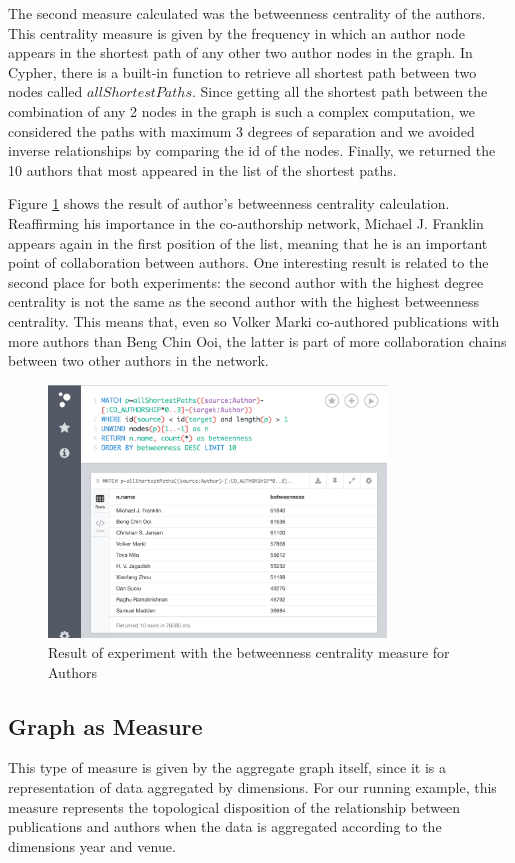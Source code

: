 The second measure calculated was the betweenness centrality of the authors. This centrality measure is given by the frequency in which an author node appears in the shortest path of any other two author nodes in the graph. In Cypher, there is a built-in function to retrieve all shortest path between two nodes called $allShortestPaths$. Since getting all the shortest path between the combination of any 2 nodes in the graph is such a complex computation, we considered the paths with maximum 3 degrees of separation and we avoided inverse relationships by comparing the id of the nodes. Finally, we returned the 10 authors that most appeared in the list of the shortest paths.

Figure \ref{fig:figure36} shows the result of author's betweenness centrality calculation. Reaffirming his importance in the co-authorship network, Michael J. Franklin appears again in the first position of the list, meaning that he is an important point of collaboration between authors. One interesting result is related to the second place for both experiments: the second author with the highest degree centrality is not the same as the second author with the highest betweenness centrality. This means that, even so Volker Marki co-authored publications with more authors than Beng Chin Ooi, the latter is part of more collaboration chains between two other authors in the network.

\begin{figure}[!h]
\centering
\includegraphics[width=0.8\textwidth]{../exp_betweenness_centrality.png}
\caption{Result of experiment with the betweenness centrality measure for Authors}
\label{fig:figure36}
\end{figure}

\subsection{Graph as Measure}
This type of measure is given by the aggregate graph itself, since it is a representation of data aggregated by dimensions. For our running example, this measure represents the topological disposition of the relationship between publications and authors when the data is aggregated according to the dimensions year and venue.  

